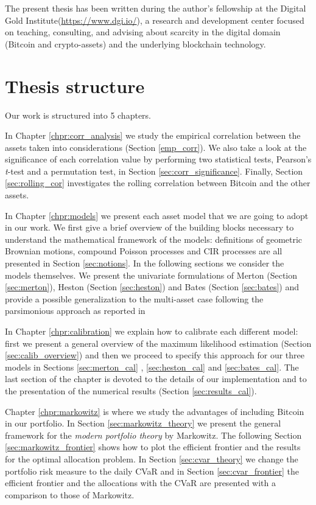 \bigskip
\noindent
The present thesis has been written during the author's fellowship at the Digital Gold Institute(\href{https://www.dgi.io/}{https://www.dgi.io/}), a research and development center focused on teaching, consulting, and advising about scarcity in the digital domain (Bitcoin and crypto-assets) and the underlying blockchain technology.

\bigskip

\section{Thesis structure}
Our work is structured into 5 chapters.

\bigskip
\noindent
In Chapter \ref{chpr:corr_analysis} we study the empirical correlation between the assets taken into considerations (Section \ref{emp_corr}). We also take a look at the significance of each correlation value by performing two statistical tests, Pearson's \textit{t}-test and a permutation test, in Section \ref{sec:corr_significance}. Finally, Section \ref{sec:rolling_cor} investigates the rolling correlation between Bitcoin and the other assets.

\bigskip
\noindent
In Chapter \ref{chpr:models} we present each asset model that we are going to adopt in our work. We first give a brief overview of the building blocks necessary to understand the mathematical framework of the models: definitions of geometric Brownian motions, compound Poisson processes and CIR processes are all presented in Section \ref{sec:notions}. 
In the following sections we consider the models themselves. We  present the univariate formulations of Merton (Section \ref{sec:merton}), Heston (Section \ref{sec:heston}) and Bates (Section \ref{sec:bates}) and provide a possible generalization to the multi-asset case following the parsimonious approach as reported in \citep{PARSIMONIOUS2011}

\bigskip
\noindent
In Chapter \ref{chpr:calibration} we explain how to calibrate each different model: first we present a general overview of the maximum likelihood estimation (Section \ref{sec:calib_overview}) and then we proceed to specify this approach for our three models in Sections \ref{sec:merton_cal} , \ref{sec:heston_cal} and \ref{sec:bates_cal}. 
The last section of the chapter is devoted to the details of our implementation and to the presentation of the numerical results (Section \ref{sec:results_cal}).

\bigskip
\noindent
Chapter \ref{chpr:markowitz} is where we study the advantages of including Bitcoin in our portfolio. In Section \ref{sec:markowitz_theory} we present the general framework for the \textit{modern portfolio theory} by Markowitz. The following Section \ref{sec:markowitz_frontier} shows how to plot the efficient frontier and the results for the optimal allocation problem.
In Section \ref{sec:cvar_theory} we change the portfolio risk measure to the daily CVaR and in Section \ref{sec:cvar_frontier} the efficient frontier and the allocations with the CVaR are presented with a comparison to those of Markowitz.

